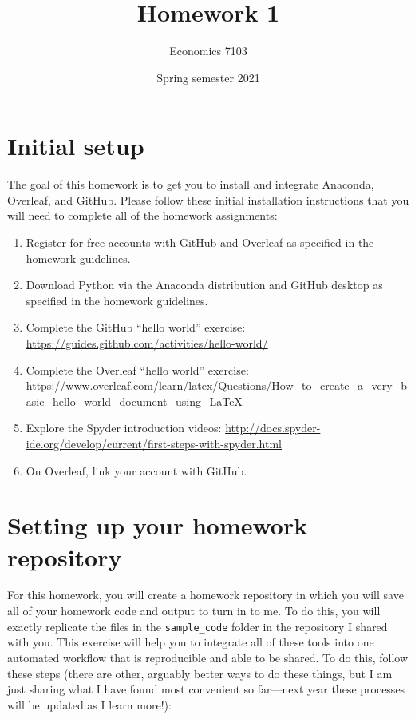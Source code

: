 \documentclass{article}
\title{Homework 1}
\author{Economics 7103}
\date{Spring semester 2021}
\begin{document}
  
\maketitle

\section*{Initial setup}
\noindent The goal of this homework is to get you to install and integrate Anaconda, Overleaf, and GitHub.  Please follow these initial installation instructions that you will need to complete all of the homework assignments:
\begin{enumerate}
    \item Register for free accounts with GitHub and Overleaf as specified in the homework guidelines.
    \item Download Python via the Anaconda distribution and GitHub desktop as specified in the homework guidelines.
    \item Complete the GitHub ``hello world'' exercise: \url{https://guides.github.com/activities/hello-world/}
    \item Complete the Overleaf ``hello world'' exercise: \url{https://www.overleaf.com/learn/latex/Questions/How_to_create_a_very_basic_hello_world_document_using_LaTeX}
    \item Explore the Spyder introduction videos: \url{http://docs.spyder-ide.org/develop/current/first-steps-with-spyder.html}
    \item On Overleaf, link your account with GitHub.
\end{enumerate}

\section*{Setting up your homework repository}

For this homework, you will create a homework repository in which you will save all of your homework code and output to turn in to me.  To do this, you will exactly replicate the files in the \verb!sample_code! folder in the repository I shared with you.  This exercise will help you to integrate all of these tools into one automated workflow that is reproducible and able to be shared.  To do this, follow these steps (there are other, arguably better ways to do these things, but I am just sharing what I have found most convenient so far---next year these processes will be updated as I learn more!):
\end{document}
